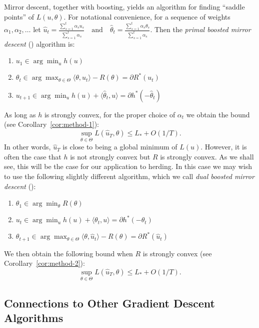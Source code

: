 \documentclass[paper.tex]{subfiles}
\begin{document}
Mirror descent, together with boosting, yields an algorithm for finding 
``saddle points'' of $L(u, \theta)$. 
For notational convenience, for a sequence of weights $\alpha_1,\alpha_2,\ldots$ 
let 
\(
\hat{u}_t = \frac{\sum_{s=1}^t \alpha_su_s}{\sum_{s=1}^t \alpha_s} 
\quad \text{and} \quad 
\hat{\theta}_t = \frac{\sum_{s=1}^t \alpha_s\theta_s}{\sum_{s=1}^t \alpha_s}.
\)
Then 
the {\em primal boosted mirror descent} (\primal) algorithm is:
\begin{enumerate}
\item $u_1 \in \arg\min_u h(u)$
\item $\theta_{t} \in \arg\max_{\theta \in \Theta} \langle \theta, u_t \rangle - R(\theta) = \partial R^{*}(u_{t})$
\item $u_{t+1} \in \arg\min_{u} h(u) + \langle \hat{\theta}_t, u \rangle = \partial h^{*}(-\hat\theta_{t})$
\end{enumerate}
As long as $h$ is strongly convex, for the proper choice of $\alpha_{t}$ we obtain the 
bound (see Corollary~\ref{cor:method-1}):
\begin{equation}
\sup_{\theta \in \Theta} L(\hat{u}_T, \theta) \leq L_{*} + O(1/T).
\end{equation}
In other words, $\hat{u}_T$ is close to being a global minimum of $L(u)$.
However, it is often the case that $h$ is not strongly convex but $R$ is strongly convex. As we shall see, this will be the case for our application to herding.
In this case we may wish to use the following slightly different algorithm, which we call {\em dual boosted mirror descent} (\dual):
\begin{enumerate}
\item $\theta_1 \in \arg\min_{\theta} R(\theta)$
\item $u_t \in \arg\min_{u} h(u) + \langle \theta_t, u \rangle = \partial h^{*}(-\theta_{t})$
\item $\theta_{t+1} \in \arg\max_{\theta \in \Theta} \langle \theta, \hat{u}_t \rangle - R(\theta) = \partial R^{*}(\hat u_{t})$
\end{enumerate}
We then obtain the following bound 
when $R$ is strongly convex (see Corollary~\ref{cor:method-2}):
\[ \sup_{\theta \in \Theta} L(\hat{u}_T, \theta) \leq L_{*} + O(1/T). \]



\subsection{Connections to Other Gradient Descent Algorithms}
\end{document}
